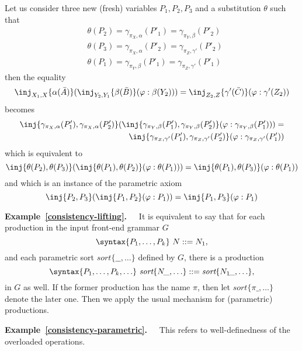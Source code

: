 \documentclass{article}
\theoremstyle{definition}
\theoremstyle{definition}
\theoremstyle{definition}
\theoremstyle{definition}
\theoremstyle{theorem}
\theoremstyle{theorem}
\theoremstyle{theorem}
\theoremstyle{theorem}
\theoremstyle{theorem}
\newcommand{\Sort}[1]{\textit{sort}\{#1\}}
\begin{document}
\begin{enumerate}[label=(\arabic*)]
{Let us consider three new (fresh) variables $P_1,P_2,P_3$ and a substitution $\theta$ such that
\begin{align*}
&\theta(P_2) = \gamma_{\pi_X,\alpha}(P'_1)=\gamma_{\pi_Y,\beta}(P'_2)\\
&\theta(P_3)= \gamma_{\pi_X,\alpha}(P'_2)=\gamma_{\pi_Z,\gamma'}(P'_2)\\
&\theta(P_1)= \gamma_{\pi_Y,\beta}(P'_1)=\gamma_{\pi_Z,\gamma'}(P'_1)
\end{align*}
then the equality
\[\inj_{X_1,X}\{\alpha(\bar{A})\}(
  \inj_{Y_2,Y_1}\{\beta(\bar{B})\}(\varphi:\beta(Y_2)))
 = \inj_{Z_2,Z}\{\gamma'(\bar{C})\}(\varphi:\gamma'(Z_2))\]
becomes
\[
\begin{split}
\inj\{\gamma_{\pi_X,\alpha}(P'_1), \gamma_{\pi_X,\alpha}(P'_2)\}(\inj\{\gamma_{\pi_Y,\beta}(P'_1),\gamma_{\pi_Y,\beta}(P'_2)\}(\varphi:\gamma_{\pi_Y,\beta}(P'_1)))=\\
\inj\{\gamma_{\pi_Z,\gamma'}(P'_1),\gamma_{\pi_Z,\gamma'}(P'_2)\}(\varphi:\gamma_{\pi_Z,\gamma'}(P'_1))
\end{split}
\]
which is equivalent to
\[
\inj\{\theta(P_2),\theta(P_3)\}(\inj\{\theta(P_1),\theta(P_2)\}(\varphi:\theta(P_1)))=
\inj\{\theta(P_1),\theta(P_3)\}(\varphi:\theta(P_1))
\]
and which is an instance of the parametric axiom
\[
\inj\{P_2,P_3\}(\inj\{P_1,P_2\}(\varphi:P_1))=\inj\{P_1,P_3\}(\varphi:P_1)
\]

\textbf{Example~\ref{consistency-lifting}.~~}
It is equivalent to say that for each production in the input front-end grammar $G$
\[\syntax\{P_1,\ldots,P_k\}\ N::=N_1,\]
and each parametric sort \(\Sort{\_\!\_,\ldots}\) defined by $G$, there is a production
\[\syntax\{P_1,\ldots,P_k,\ldots\}\ \Sort{N\!\_,\ldots}::=\Sort{N_1\!\_,\ldots},\]
in $G$ as well. 
If the former production has the name $\pi$, then let $\Sort{\pi\!\_,\ldots}$ denote the later one.
Then we apply the usual mechanism for (parametric) productions.


\textbf{Example~\ref{consistency-parametric}.~~}
This refers to well-definedness of the overloaded operations.

}
\end{enumerate}
\end{document}
